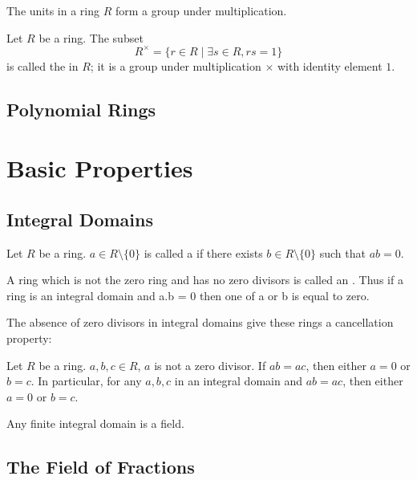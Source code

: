 \begin{proposition}
The units in a ring $R$ form a group under multiplication.
\end{proposition}

\begin{definition}
Let $R$ be a ring. The subset
\[R^\times = \{r\in R\mid \exists s\in R, rs=1\}\]
is called the  in $R$; it is a group under multiplication $\times$ with identity element $1$.
\end{definition}

\subsection{Polynomial Rings}

\section{Basic Properties}
\subsection{Integral Domains}
\begin{definition}
Let $R$ be a ring. $a\in R\setminus\{0\}$ is called a  if there exists $b\in R\setminus\{0\}$ such that $ab=0$.

A ring which is not the zero ring and has no zero divisors is called an . Thus if a ring is an integral domain and a.b = 0 then one of a or b is equal to zero.
\end{definition}

The absence of zero divisors in integral domains give these rings a cancellation property:

\begin{proposition}
Let $R$ be a ring. $a,b,c\in R$, $a$ is not a zero divisor. If $ab=ac$, then either $a=0$ or $b=c$. In particular, for any $a,b,c$ in an integral domain and $ab=ac$, then either $a=0$ or $b=c$.
\end{proposition}

\begin{corollary}
Any finite integral domain is a field.
\end{corollary}

\subsection{The Field of Fractions}

